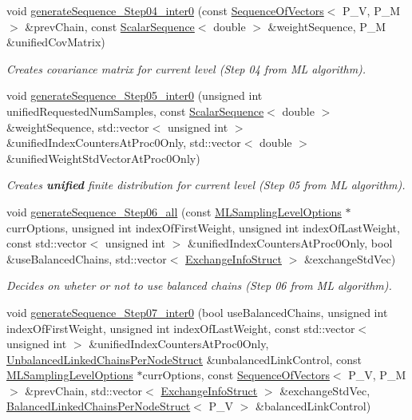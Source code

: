 \begin{DoxyCompactItemize}
void \hyperlink{class_q_u_e_s_o_1_1_m_l_sampling_a955fb446652327edbc275e3d9145e2db}{generate\-Sequence\-\_\-\-Step04\-\_\-inter0} (const \hyperlink{class_q_u_e_s_o_1_1_sequence_of_vectors}{Sequence\-Of\-Vectors}$<$ P\-\_\-\-V, P\-\_\-\-M $>$ \&prev\-Chain, const \hyperlink{class_q_u_e_s_o_1_1_scalar_sequence}{Scalar\-Sequence}$<$ double $>$ \&weight\-Sequence, P\-\_\-\-M \&unified\-Cov\-Matrix)
\begin{DoxyCompactList}\small\item\em Creates covariance matrix for current level (Step 04 from M\-L algorithm). \end{DoxyCompactList}\item 
void \hyperlink{class_q_u_e_s_o_1_1_m_l_sampling_a3db529d364d5bb47916066d7cc21cb00}{generate\-Sequence\-\_\-\-Step05\-\_\-inter0} (unsigned int unified\-Requested\-Num\-Samples, const \hyperlink{class_q_u_e_s_o_1_1_scalar_sequence}{Scalar\-Sequence}$<$ double $>$ \&weight\-Sequence, std\-::vector$<$ unsigned int $>$ \&unified\-Index\-Counters\-At\-Proc0\-Only, std\-::vector$<$ double $>$ \&unified\-Weight\-Std\-Vector\-At\-Proc0\-Only)
\begin{DoxyCompactList}\small\item\em Creates {\bfseries unified} finite distribution for current level (Step 05 from M\-L algorithm). \end{DoxyCompactList}\item 
void \hyperlink{class_q_u_e_s_o_1_1_m_l_sampling_a21f642100e0690f65563e2c1f8bed816}{generate\-Sequence\-\_\-\-Step06\-\_\-all} (const \hyperlink{class_q_u_e_s_o_1_1_m_l_sampling_level_options}{M\-L\-Sampling\-Level\-Options} $\ast$curr\-Options, unsigned int index\-Of\-First\-Weight, unsigned int index\-Of\-Last\-Weight, const std\-::vector$<$ unsigned int $>$ \&unified\-Index\-Counters\-At\-Proc0\-Only, bool \&use\-Balanced\-Chains, std\-::vector$<$ \hyperlink{struct_q_u_e_s_o_1_1_exchange_info_struct}{Exchange\-Info\-Struct} $>$ \&exchange\-Std\-Vec)
\begin{DoxyCompactList}\small\item\em Decides on wheter or not to use balanced chains (Step 06 from M\-L algorithm). \end{DoxyCompactList}\item 
void \hyperlink{class_q_u_e_s_o_1_1_m_l_sampling_a270d639f90f6f2c60d1af851eea63d41}{generate\-Sequence\-\_\-\-Step07\-\_\-inter0} (bool use\-Balanced\-Chains, unsigned int index\-Of\-First\-Weight, unsigned int index\-Of\-Last\-Weight, const std\-::vector$<$ unsigned int $>$ \&unified\-Index\-Counters\-At\-Proc0\-Only, \hyperlink{struct_q_u_e_s_o_1_1_unbalanced_linked_chains_per_node_struct}{Unbalanced\-Linked\-Chains\-Per\-Node\-Struct} \&unbalanced\-Link\-Control, const \hyperlink{class_q_u_e_s_o_1_1_m_l_sampling_level_options}{M\-L\-Sampling\-Level\-Options} $\ast$curr\-Options, const \hyperlink{class_q_u_e_s_o_1_1_sequence_of_vectors}{Sequence\-Of\-Vectors}$<$ P\-\_\-\-V, P\-\_\-\-M $>$ \&prev\-Chain, std\-::vector$<$ \hyperlink{struct_q_u_e_s_o_1_1_exchange_info_struct}{Exchange\-Info\-Struct} $>$ \&exchange\-Std\-Vec, \hyperlink{struct_q_u_e_s_o_1_1_balanced_linked_chains_per_node_struct}{Balanced\-Linked\-Chains\-Per\-Node\-Struct}$<$ P\-\_\-\-V $>$ \&balanced\-Link\-Control)

\end{DoxyCompactItemize}
